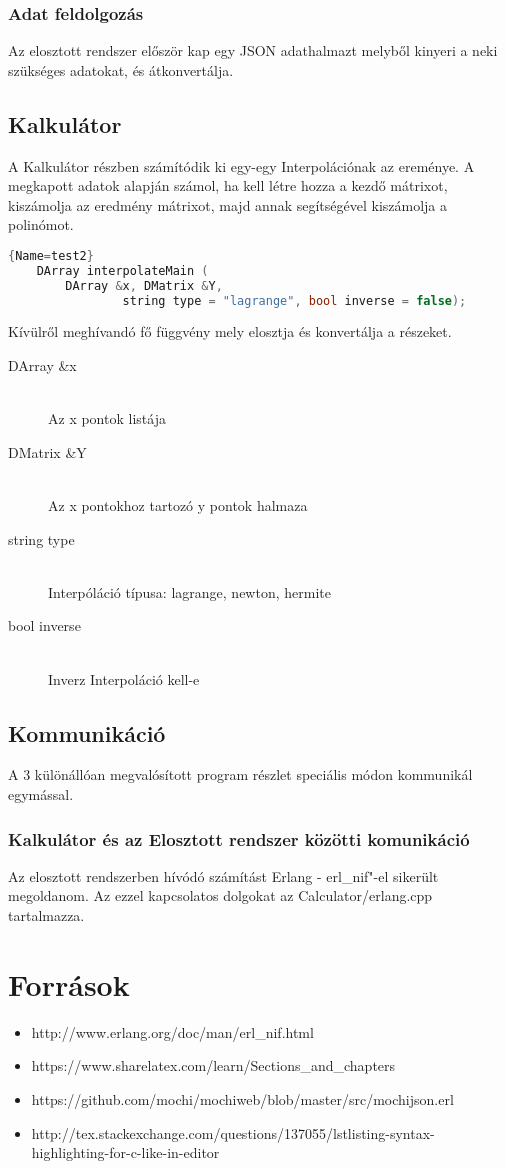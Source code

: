 \documentclass{elteikthesis}
\begin{document}
\subsection{Adat feldolgozás}
Az elosztott rendszer először kap egy JSON adathalmazt melyből kinyeri a neki szükséges adatokat, és átkonvertálja.

\section{Kalkulátor}
A Kalkulátor részben számítódik ki egy-egy Interpolációnak az ereménye.
A megkapott adatok alapján számol, ha kell létre hozza a kezdő mátrixot, kiszámolja az eredmény mátrixot, majd annak segítségével kiszámolja a polinómot.
\begin{lstlisting}[language=C++]{Name=test2}
	DArray interpolateMain (
		DArray &x, DMatrix &Y, 
				string type = "lagrange", bool inverse = false);
\end{lstlisting}
	Kívülről meghívandó fő függvény mely elosztja és konvertálja a részeket. 
	\begin{description}
	  \item[DArray \&x] \hfill \\ Az x pontok listája 
	  \item[DMatrix \&Y] \hfill \\ Az x pontokhoz tartozó y pontok halmaza
	  \item[string type] \hfill \\ Interpóláció típusa: lagrange, newton, hermite
	  \item[bool inverse] \hfill \\ Inverz Interpoláció kell-e
	\end{description}


\section{Kommunikáció}
A 3 különállóan megvalósított program részlet speciális módon kommunikál egymással. 
\subsection{Kalkulátor és az Elosztott rendszer közötti komunikáció} 
Az elosztott rendszerben hívódó számítást Erlang - erl\_nif"-el sikerült megoldanom. 
Az ezzel kapcsolatos dolgokat az Calculator/erlang.cpp tartalmazza. 


\chapter{Források}
\begin{itemize}
\item {http://www.erlang.org/doc/man/erl\_nif.html}
\item {https://www.sharelatex.com/learn/Sections\_and\_chapters}
\item {https://github.com/mochi/mochiweb/blob/master/src/mochijson.erl} 
\item {http://tex.stackexchange.com/questions/137055/lstlisting-syntax-highlighting-for-c-like-in-editor} 
\end{itemize}
\end{document}
